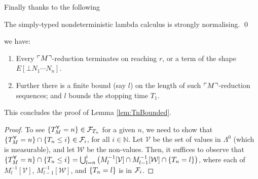 Finally thanks to the following
\begin{therm}
\label{thm:de groote}
The simply-typed nondeterministic lambda calculus is strongly normalising. \qed
\end{therm}
we have:

\begin{enumerate}
\item Every ${\ulcorner{M}\urcorner}$-reduction terminates on reaching $r$, or a term of the shape $E[\bot N_1 \cdots N_n]$.

\item Further there is a finite bound (say $l$) on the length of such ${\ulcorner{M}\urcorner}$-reduction sequences; and $l$ bounds the stopping time $T_1$.
\end{enumerate}
This concludes the proof of Lemma \ref{lem:TnBounded}.

\iffalse
@inproceedings{DBLP:conf/lfcs/Groote94,
  author    = {Philippe de Groote},
  editor    = {Anil Nerode and
               Yuri V. Matiyasevich},
  title     = {Strong Normalization in a Non-Deterministic Typed Lambda-Calculus},
  booktitle = {Logical Foundations of Computer Science, Third International Symposium,
               LFCS'94, St. Petersburg, Russia, July 11-14, 1994, Proceedings},
  series    = {Lecture Notes in Computer Science},
  volume    = {813},
  pages     = {142--152},
  publisher = {Springer},
  year      = {1994},
  url       = {https://doi.org/10.1007/3-540-58140-5\_15},
  doi       = {10.1007/3-540-58140-5\_15},
  timestamp = {Tue, 14 May 2019 10:00:54 +0200},
  biburl    = {https://dblp.org/rec/conf/lfcs/Groote94.bib},
  bibsource = {dblp computer science bibliography, https://dblp.org}
}
\fi

\medskip

\TMtYStoppingTime*
\begin{proof}
To see $\{{T_M^{\mathsf{Y}} = n}\} \in \mathcal{F}_{T_n}$ for a given $n$, we need to show that $\{{T_M^{\mathsf{Y}} = n}\} \cap \{{T_n \leq i}\} \in \mathcal{F}_i$, for all $i \in \mathbb N$.
Let $\mathcal V$ be the set of values in $\Lambda^0$ (which is measurable), and let $\mathcal W$ be the non-values.
Then, it suffices to observe that $\{{T_M^{\mathsf{Y}} = n}\} \cap \{{T_n \leq i}\}
= \bigcup_{l=n}^i 
\big( M_l^{-1} [{\mathcal V}] \cap  
M_{l-1}^{-1} [{\mathcal W}] \cap 
\{{T_n = l}\} \big)
$, where each of $M_l^{-1} [{\mathcal V}]$, $M_{l-1}^{-1} [{\mathcal W}]$, and $\{{T_n = l}\}$ is in $\mathcal{F}_i$.
\end{proof}



